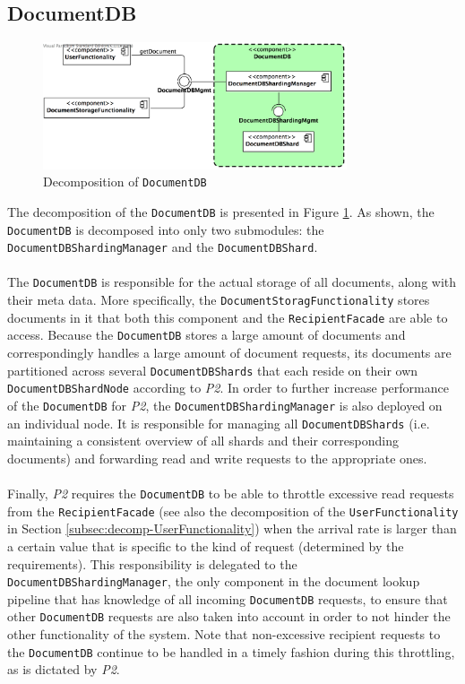 \documentclass[a4paper,10pt]{article}
\begin{document}
\subsection{DocumentDB}\label{subsec:decomp-DocumentDB}
\begin{figure}[!htp]
	\centering
	\includegraphics[width=0.8\textwidth]{DocumentDB.png}
	\caption{Decomposition of \texttt{DocumentDB}}
	\label{fig:decomp-DocumentDB}
\end{figure}
\FloatBarrier
\noindent
The decomposition of the \texttt{DocumentDB} is presented in Figure \ref{fig:decomp-DocumentDB}. As shown, the \texttt{DocumentDB} is decomposed into only two submodules: the \texttt{DocumentDBShardingManager} and the \texttt{DocumentDBShard}.\\\\
The \texttt{DocumentDB} is responsible for the actual storage of all documents, along with their meta data. More specifically, the \texttt{DocumentStoragFunctionality} stores documents in it that both this component and the \texttt{RecipientFacade} are able to access. Because the \texttt{DocumentDB} stores a large amount of documents and correspondingly handles a large amount of document requests, its documents are partitioned across several \texttt{DocumentDBShards} that each reside on their own \texttt{DocumentDBShardNode} according to \textit{P2}. In order to further increase performance of the \texttt{DocumentDB} for \textit{P2}, the \texttt{DocumentDBShardingManager} is also deployed on an individual node. It is responsible for managing all \texttt{DocumentDBShards} (i.e. maintaining a consistent overview of all shards and their corresponding documents) and forwarding read and write requests to the appropriate ones.\\\\
Finally, \textit{P2} requires the \texttt{DocumentDB} to be able to throttle excessive read requests from the \texttt{RecipientFacade} (see also the decomposition of the \texttt{UserFunctionality} in Section \ref{subsec:decomp-UserFunctionality}) when the arrival rate is larger than a certain value that is specific to the kind of request (determined by the requirements). This responsibility is delegated to the \texttt{DocumentDBShardingManager}, the only component in the document lookup pipeline that has knowledge of all incoming \texttt{DocumentDB} requests, to ensure that other \texttt{DocumentDB} requests are also taken into account in order to not hinder the other functionality of the system. Note that non-excessive recipient requests to the \texttt{DocumentDB} continue to be handled in a timely fashion during this throttling, as is dictated by \textit{P2}.
\end{document}

